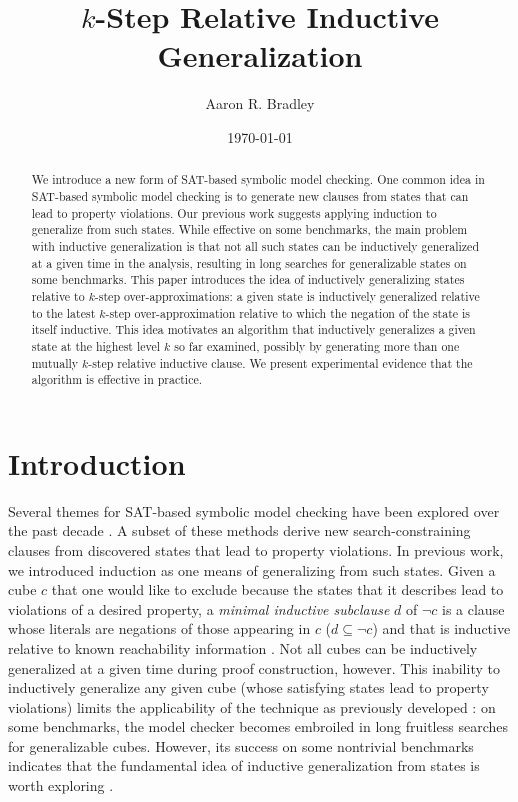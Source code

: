 \documentclass{llncs}
\title{$k$-Step Relative Inductive Generalization}
\author{Aaron R. Bradley}
\institute{Dept. of Electrical, Computer \& Energy Engineering \\
University of Colorado at Boulder \\
Boulder, CO 80309 \\
{\tt bradleya@colorado.edu}
}
\date{\today}
\newcommand{\bnot}{\neg}
\begin{document}
\maketitle
\begin{abstract}
We introduce a new form of SAT-based symbolic model checking.  One
common idea in SAT-based symbolic model checking is to generate new
clauses from states that can lead to property violations.  Our
previous work suggests applying induction to generalize from such
states.  While effective on some benchmarks, the main problem with
inductive generalization is that not all such states can be
inductively generalized at a given time in the analysis, resulting in
long searches for generalizable states on some benchmarks.  This paper
introduces the idea of inductively generalizing states relative to
$k$-step over-approximations: a given state is inductively generalized
relative to the latest $k$-step over-approximation relative to which
the negation of the state is itself inductive.  This idea motivates an
algorithm that inductively generalizes a given state at the highest
level $k$ so far examined, possibly by generating more than one
mutually $k$-step relative inductive clause.  We present experimental
evidence that the algorithm is effective in practice.
\end{abstract}

\newcommand{\vx}{\bar{x}}
\newcommand{\notmodels}[2]{#2 \not\models #1}
\newcommand{\mymodels}[2]{#2 \models #1}

\section{Introduction}

Several themes for SAT-based symbolic model checking
\cite{Burch+Others/1990} have been explored over the past decade
\cite{Biere+Others/1999,Sheeran+Others/2000,McMillan/2002,McMillan/2003,DeMoura+Others/2003,Bradley+Manna/2007}.
A subset of these methods
\cite{McMillan/2002,DeMoura+Others/2003,Bradley+Manna/2007} derive new
search-constraining clauses from discovered states that lead to
property violations.  In previous work, we introduced induction as one
means of generalizing from such states.  Given a cube $c$ that one
would like to exclude because the states that it describes lead to
violations of a desired property, a \emph{minimal inductive subclause}
$d$ of $\bnot c$ is a clause whose literals are negations of those
appearing in $c$ ($d \subseteq \bnot c$) and that is inductive
relative to known reachability information \cite{Bradley+Manna/2007}.
Not all cubes can be inductively generalized at a given time during
proof construction, however.  This inability to inductively generalize
any given cube (whose satisfying states lead to property violations)
limits the applicability of the technique as previously developed
\cite{Bradley+Manna/2007}: on some benchmarks, the model checker
becomes embroiled in long fruitless searches for generalizable cubes.
However, its success on some nontrivial benchmarks indicates that the
fundamental idea of inductive generalization from states is worth
exploring \cite{Bradley/2007}.
\end{document}
